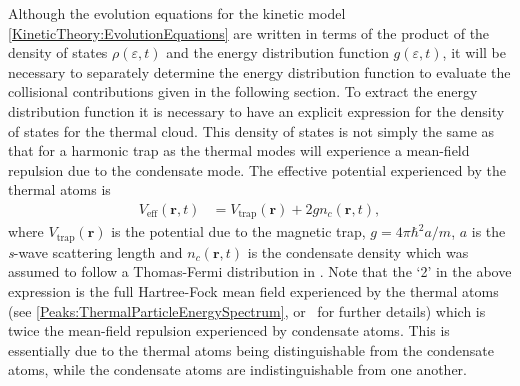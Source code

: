 Although the evolution equations for the kinetic model \eqref{KineticTheory:EvolutionEquations} are written in terms of the product of the density of states $\rho(\varepsilon, t)$ and the energy distribution function $g(\varepsilon, t)$, it will be necessary to separately determine the energy distribution function to evaluate the collisional contributions given in the following section. To extract the energy distribution function it is necessary to have an explicit expression for the density of states for the thermal cloud. This density of states is not simply the same as that for a harmonic trap as the thermal modes will experience a mean-field repulsion due to the condensate mode. The effective potential experienced by the thermal atoms is
\begin{align}
    V_\text{eff}(\bm{r}, t) &= V_\text{trap}(\bm{r}) + 2 g n_c(\bm{r}, t), \label{MethodsAppendix:QKTEffectivePotential}
\end{align}
where $V_\text{trap}(\bm{r})$ is the potential due to the magnetic trap, $g = 4\pi \hbar^2 a/m$, $a$ is the \emph{s}-wave scattering length and $n_c(\bm{r}, t)$ is the condensate density which was assumed to follow a Thomas-Fermi distribution in .  Note that the `2' in the above expression is the full Hartree-Fock mean field experienced by the thermal atoms (see \eqref{Peaks:ThermalParticleEnergySpectrum}, or~\citep[Chapter 8]{PethickSmith} for further details) which is twice the mean-field repulsion experienced by condensate atoms.  This is essentially due to the thermal atoms being distinguishable from the condensate atoms, while the condensate atoms are indistinguishable from one another.

